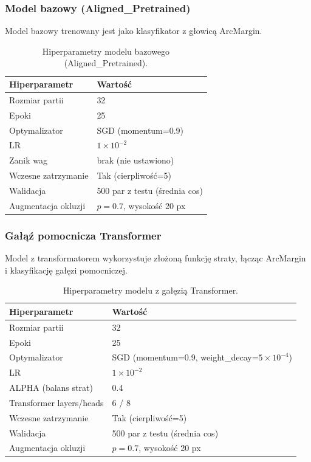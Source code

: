\subsubsection{Model bazowy (Aligned\_Pretrained)}
Model bazowy trenowany jest jako klasyfikator z głowicą ArcMargin.

\begin{table}[h]
\centering
\small
\begin{tabular}{ll}
\toprule
\textbf{Hiperparametr} & \textbf{Wartość} \\
\midrule
Rozmiar partii & 32 \\
Epoki & 25 \\
Optymalizator & SGD (momentum=0.9) \\
LR & $1 \times 10^{-2}$ \\
Zanik wag & brak (nie ustawiono) \\
Wczesne zatrzymanie & Tak (cierpliwość=5) \\
Walidacja & 500 par z testu (średnia cos) \\
Augmentacja okluzji & $p=0.7$, wysokość 20 px \\
\bottomrule
\end{tabular}
\caption{Hiperparametry modelu bazowego (Aligned\_Pretrained).}
\label{tab:baseline_config}
\end{table}

\subsubsection{Gałąź pomocnicza Transformer}
Model z transformatorem wykorzystuje złożoną funkcję straty, łącząc ArcMargin i klasyfikację gałęzi pomocniczej.

\begin{table}[h]
\centering
\small
\begin{tabular}{ll}
\toprule
\textbf{Hiperparametr} & \textbf{Wartość} \\
\midrule
Rozmiar partii & 32 \\
Epoki & 25 \\
Optymalizator & SGD (momentum=0.9, weight\_decay=$5\times 10^{-4}$) \\
LR & $1 \times 10^{-2}$ \\
ALPHA (balans strat) & 0.4 \\
Transformer layers/heads & 6 / 8 \\
Wczesne zatrzymanie & Tak (cierpliwość=5) \\
Walidacja & 500 par z testu (średnia cos) \\
Augmentacja okluzji & $p=0.7$, wysokość 20 px \\
\bottomrule
\end{tabular}
\caption{Hiperparametry modelu z gałęzią Transformer.}
\label{tab:transformer_config}
\end{table}

